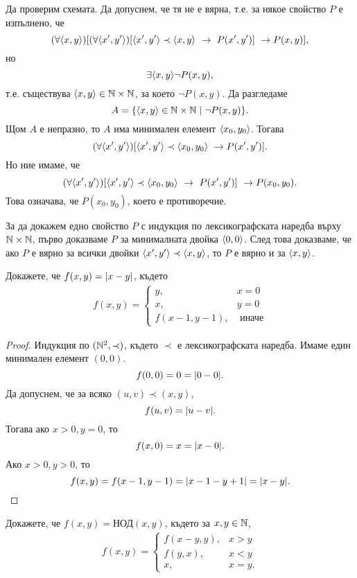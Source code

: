 Да проверим схемата.
Да допуснем, че тя не е вярна, т.е. за някое свойство $P$ е изпълнено, че
\[(\forall\pair{x,y})[(\forall \pair{x^\prime,y^\prime})[\pair{x^\prime,y^\prime} \prec \pair{x,y}\ \rightarrow\ P(x^\prime,y^\prime)]\ \rightarrow P(x,y)],\]
но \[\exists \langle{x,y}\rangle \neg P(x,y),\]
т.е. съществува $\langle{x,y}\rangle \in \mathbb{N}\times\mathbb{N}$, за което $\neg P(x,y)$.
Да разгледаме
\[A = \{\langle{x,y}\rangle\in \mathbb{N}\times\mathbb{N}\mid \neg P(x,y)\}.\]
Щом $A$ е непразно, то $A$ има минимален елемент $\langle{x_0,y_0}\rangle$.
Тогава
\[(\forall \pair{x^\prime,y^\prime})[\pair{x^\prime,y^\prime} \prec\pair{x_0,y_0}\ \rightarrow P(x^\prime,y^\prime)].\]
Но ние имаме, че 
\[(\forall \pair{x^\prime,y^\prime})[\pair{x^\prime,y^\prime} \prec \pair{x_0,y_0}\ \rightarrow\ P(x^\prime,y^\prime)]\ \rightarrow P(x_0,y_0).\]
Това означава, че $P(x_0,y_0)$, което е противоречие.

\begin{remark}
  За да докажем едно свойство $P$ с индукция по лексикографската наредба върху $\mathbb{N}\times\mathbb{N}$,
  първо доказваме $P$ за минималната двойка $\langle{0,0}\rangle$.
  След това доказваме, че ако $P$ е вярно за всички двойки $\langle{x^\prime,y^\prime}\rangle\prec \langle{x,y}\rangle$,
  то $P$ е вярно и за $\langle{x,y}\rangle$.
\end{remark}

\begin{problem}
  Докажете,  че $f(x,y) = \lvert{x-y}\rvert$, където
  \begin{align*}
    f(x,y) = 
    \begin{cases}
      y, & x = 0\\
      x, & y = 0\\
      f(x-1,y-1), & \mbox{ иначе}
    \end{cases}
  \end{align*}
\end{problem}
\begin{proof}
  Индукция по $(\mathbb{N}^2,\prec)$, където $\prec$ е лексикографската наредба.
  Имаме един минимален елемент $(0,0)$.
  \[f(0,0) = 0 = \lvert{0 - 0}\rvert.\]
  Да допуснем, че за всяко $(u,v) \prec (x,y)$, 
  \[f(u,v) = \lvert{u - v}\rvert.\]
  Тогава ако $x > 0, y = 0$, то
  \[f(x,0) = x = \lvert{x - 0}\rvert.\]
  Ако $x> 0, y > 0$, то
  \[f(x,y) = f(x-1,y-1) = \lvert{x-1-y+1}\rvert =\lvert{x-y}\rvert.\]
\end{proof}

\begin{problem}
  Докажете, че $f(x,y) = \mbox{НОД}(x,y)$, където
  за $x,y \in \mathbb{N}$,
  \begin{align*}
    f(x,y) = 
    \begin{cases}
      f(x-y,y), & x > y\\
      f(y,x), & x < y\\
      x, & x = y.
    \end{cases}
  \end{align*}
\end{problem}

